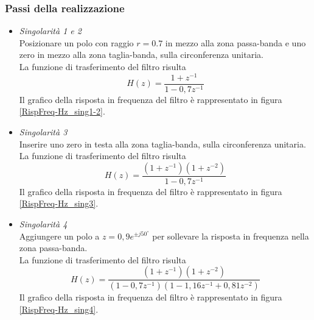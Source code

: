 \subsubsection*{Passi della realizzazione}
\begin{itemize}
\item \emph{Singolarit\`a 1 e 2}\\
Posizionare un polo con raggio $r=0.7$ in mezzo alla zona passa-banda e uno zero in mezzo alla zona taglia-banda, sulla circonferenza unitaria.\\
La funzione di trasferimento del filtro risulta
\begin{displaymath}
H(z)=\frac{1+z^{-1}}{1-0,7z^{-1}}
\end{displaymath}
Il grafico della risposta in frequenza del filtro \`e rappresentato in figura \ref{RispFreq-Hz_sing1-2}.

\item \emph{Singolarit\`a 3} \\
Inserire uno zero in testa alla zona taglia-banda, sulla circonferenza unitaria.\\
La funzione di trasferimento del filtro risulta
\begin{displaymath}
H(z)=\frac{(1+z^{-1})(1+z^{-2})}{1-0,7z^{-1}}
\end{displaymath}
Il grafico della risposta in frequenza del filtro \`e rappresentato in figura \ref{RispFreq-Hz_sing3}.


\item \emph{Singolarit\`a 4} \\
Aggiungere un polo a $z=0,9e^{\pm j50^{\circ}}$ per sollevare la risposta in frequenza nella zona passa-banda.\\
La funzione di trasferimento del filtro risulta
\begin{displaymath}
H(z)=\frac{(1+z^{-1})(1+z^{-2})}{(1-0,7z^{-1})(1-1,16z^{-1}+0,81z^{-2})}
\end{displaymath}
Il grafico della risposta in frequenza del filtro \`e rappresentato in figura \ref{RispFreq-Hz_sing4}.



\end{itemize}
